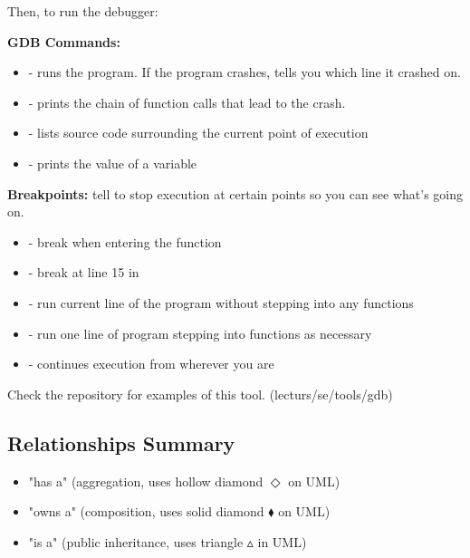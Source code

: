 \documentclass[english, 11pt]{article}
\begin{document}
\begin{center}
\end{center}
Then, to run the debugger:
\begin{center}
\end{center}

\textbf{GDB Commands:}
\begin{itemize}
  \item {} - runs the program. If the program crashes, tells you which line it crashed on.
  \item {} - prints the chain of function calls that lead to the crash.
  \item {} - lists source code surrounding the current point of execution
  \item {} - prints the value of a variable
\end{itemize}

\textbf{Breakpoints:} tell  to stop execution at certain points so you can see what's going on.
\begin{itemize}
  \item {} - break when entering the  function
  \item {} - break at line 15 in 
  \item {} - run current line of the program without stepping into any functions
  \item {} - run one line of program stepping into functions as necessary
  \item {} - continues execution from wherever you are
\end{itemize}

Check the repository for examples of this tool. (lecturs/se/tools/gdb)

\subsection{Relationships Summary}

\begin{itemize}
  \item "has a" (aggregation, uses hollow diamond  $\Diamond$ on UML)
  \item "owns a" (composition, uses solid diamond $\blacklozenge$ on UML)
  \item "is a" (public inheritance, uses triangle $\vartriangle$ in UML)
\end{itemize}
\end{document}
